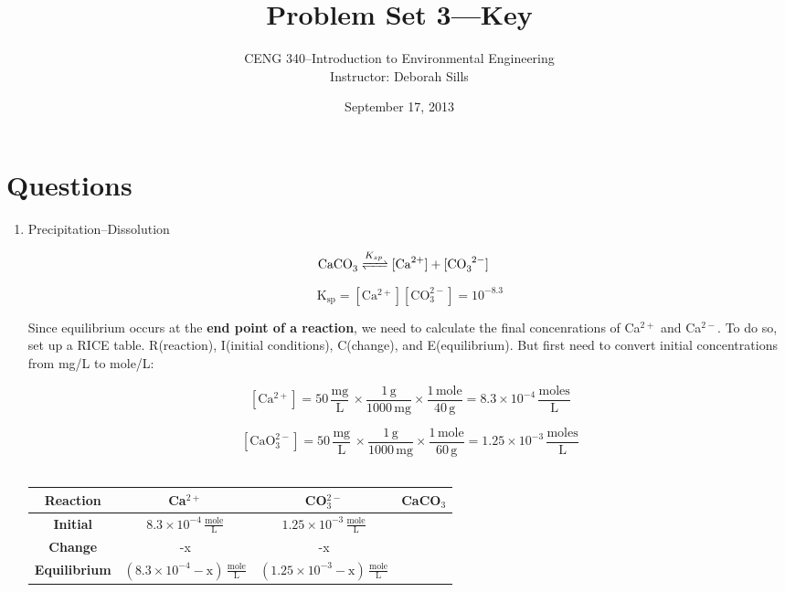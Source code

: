 \documentclass[12pt,letterpaper]{article}
\begin{document}
\setlength{\parindent}{0cm} 


\frenchspacing

\title {Problem Set 3---Key} 
\author {CENG 340--Introduction to Environmental Engineering\\
Instructor: Deborah Sills}
\date {September 17, 2013}
\maketitle



\section *{Questions}
\begin{enumerate}
\item Precipitation--Dissolution

\begin{align*}
\cee{CaCO_3 &<=>[K_{sp}] [Ca^{2+}] + [CO_3^{2-}]} 
\end{align*}

\begin{equation*}
\mathrm{K_{sp} = [Ca^{2+}][CO_3^{2-}]= 10^{-8.3}}
\end{equation*}

Since equilibrium occurs at the \textbf{end point of a reaction}, we need to calculate the final concenrations of Ca$^{2+}$ and Ca$^{2-}$. To do so, set up a RICE table.  R(reaction), I(initial conditions), C(change), and E(equilibrium).  But first need to convert initial concentrations from mg/L to mole/L:

\begin{equation*}
\mathrm{ [Ca^{2+}] = 50\, \frac{mg}{L}\, \times \frac{1\, g}{1000\, mg}\times \frac{1\, mole}{40\, g} = 8.3\times 10^{-4}\, \frac{moles}{L}}
\end{equation*}

\begin{equation*}
\mathrm{ [CaO_3^{2-}] = 50\, \frac{mg}{L}\, \times \frac{1\, g}{1000\, mg}\times \frac{1\, mole}{60\, g} = 1.25\times 10^{-3}\, \frac{moles}{L}}
\end{equation*}\\



\begin{minipage}{\linewidth}
\centering
{} \label{tab:title}

\begin{tabular}{|c|c|c|p{3.1cm}|}\toprule[1.25pt]
\bf {R}eaction & \bf Ca$^{2+}$	& \bf CO$_3^{2-}$	& \bf CaCO$_3$\\\midrule
\bf{I}nitial	&  $\mathrm{8.3\times 10^{-4}\, \frac{mole}{L}}$	& $\mathrm{1.25\times 10^{-3}\, \frac{mole}{L}}$ & \\ \hline
\bf{C}hange	& -x 	& -x	& \\ \hline
\bf{E}quilibrium & $\mathrm{(8.3\times 10^{-4} - x)\, \frac{mole}{L}}$	& $\mathrm{(1.25\times 10^{-3} -x)\, \frac{mole}{L}}$	&  \\  \hline


\end{tabular}
\end{minipage}
\end{enumerate}
\end{document}
